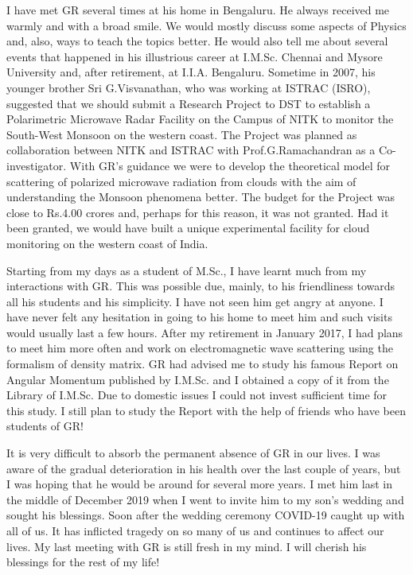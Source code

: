 I have met GR several times at his home in Bengaluru. He always received me warmly and with a broad smile. We would mostly discuss some aspects of Physics and, also, ways to teach the topics better. He would also tell me about several events that happened in his illustrious career at I.M.Sc. Chennai and Mysore University and, after retirement, at I.I.A. Bengaluru. Sometime in 2007, his younger brother Sri G.Visvanathan, who was working at ISTRAC (ISRO), suggested that we should submit a Research Project to DST to establish a Polarimetric Microwave Radar Facility on the Campus of NITK to monitor the South-West Monsoon on the western coast. The Project was planned as collaboration between NITK and ISTRAC with Prof.G.Ramachandran as a Co-investigator. With GR's guidance we were to develop the theoretical model for scattering of polarized microwave radiation from clouds with the aim of understanding the Monsoon phenomena better. The budget for the Project was close to Rs.4.00 crores and, perhaps for this reason, it was not granted. Had it been granted, we would have built a unique experimental facility for cloud monitoring on the western coast of India.

Starting from my days as a student of M.Sc., I have learnt much from my interactions with GR. This was possible due, mainly, to his friendliness towards all his students and his simplicity. I have not seen him get angry at anyone. I have never felt any hesitation in going to his home to meet him and such visits would usually last a few hours. After my retirement in January 2017, I had plans to meet him more often and work on electromagnetic wave scattering using the formalism of density matrix. GR had advised me to study his famous Report on Angular Momentum published by I.M.Sc. and I obtained a copy of it from the Library of I.M.Sc. Due to domestic issues I could not invest sufficient time for this study. I still plan to study the Report with the help of friends who have been students of GR!

It is very difficult to absorb the permanent absence of GR in our lives. I was aware of the gradual deterioration in his health over the last couple of years, but I was hoping that he would be around for several more years. I met him last in the middle of December 2019 when I went to invite him to my son's wedding and sought his blessings. Soon after the wedding ceremony COVID-19 caught up with all of us. It has inflicted tragedy on so many of us and continues to affect our lives. My last meeting with GR is still fresh in my mind. I will cherish his blessings for the rest of my life!

